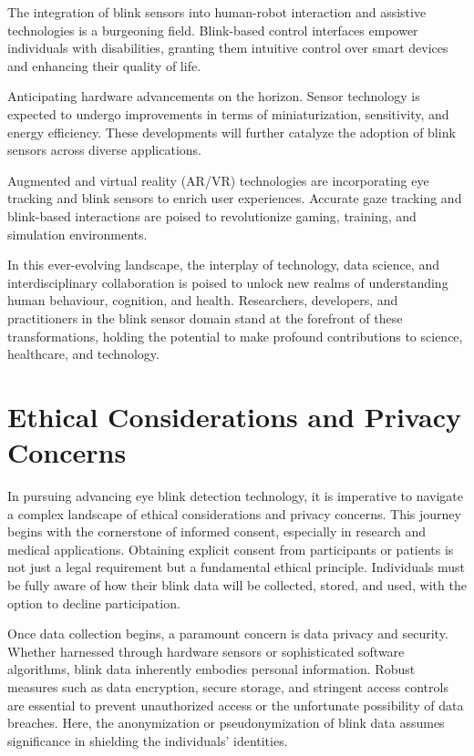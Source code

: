 \documentclass[conference]{IEEEtran}
\begin{document}
The integration of blink sensors into human-robot interaction and assistive technologies is a burgeoning field. Blink-based control interfaces empower individuals with disabilities, granting them intuitive control over smart devices and enhancing their quality of life.

Anticipating hardware advancements on the horizon. Sensor technology is expected to undergo improvements in terms of miniaturization, sensitivity, and energy efficiency. These developments will further catalyze the adoption of blink sensors across diverse applications.

Augmented and virtual reality (AR/VR) technologies are incorporating eye tracking and blink sensors to enrich user experiences. Accurate gaze tracking and blink-based interactions are poised to revolutionize gaming, training, and simulation environments.

In this ever-evolving landscape, the interplay of technology, data science, and interdisciplinary collaboration is poised to unlock new realms of understanding human behaviour, cognition, and health. Researchers, developers, and practitioners in the blink sensor domain stand at the forefront of these transformations, holding the potential to make profound contributions to science, healthcare, and technology.


\section{Ethical Considerations and Privacy Concerns}
In pursuing advancing eye blink detection technology, it is imperative to navigate a complex landscape of ethical considerations and privacy concerns. This journey begins with the cornerstone of informed consent, especially in research and medical applications. Obtaining explicit consent from participants or patients is not just a legal requirement but a fundamental ethical principle. Individuals must be fully aware of how their blink data will be collected, stored, and used, with the option to decline participation.

Once data collection begins, a paramount concern is data privacy and security. Whether harnessed through hardware sensors or sophisticated software algorithms, blink data inherently embodies personal information. Robust measures such as data encryption, secure storage, and stringent access controls are essential to prevent unauthorized access or the unfortunate possibility of data breaches. Here, the anonymization or pseudonymization of blink data assumes significance in shielding the individuals' identities.
\end{document}
